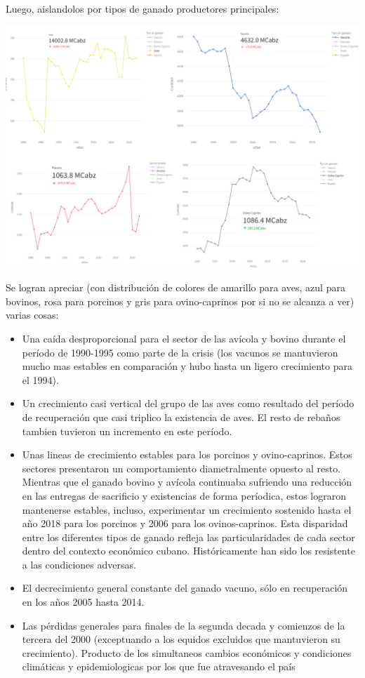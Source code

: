 \documentclass{article}
\begin{document}
Luego, aislandolos por tipos de ganado productores principales:
\begin{center}
    \includegraphics[width=1.0\textwidth]{img/plots_exist.png}
\end{center}
Se logran apreciar (con distribución de colores de amarillo para aves, azul para bovinos, rosa para porcinos y gris para ovino-caprinos por si no se alcanza a ver) varias cosas:
\begin{itemize}
    \item Una caída desproporcional para el sector de las avícola y bovino durante el período de 1990-1995 como parte de la crisis (los vacunos se mantuvieron mucho mas estables en comparación y hubo hasta un ligero crecimiento para el 1994).
    \item Un crecimiento casi vertical del grupo de las aves como resultado del período de recuperación que casi triplico la existencia de aves. El resto de rebaños tambien tuvieron un incremento en este período.
    \item Unas lineas de crecimiento estables para los porcinos y ovino-caprinos. Estos sectores presentaron un comportamiento diametralmente opuesto al resto. Mientras que el ganado bovino y avícola continuaba sufriendo una reducción en las 
    entregas de sacrificio y existencias de forma períodica, estos lograron mantenerse estables, incluso, experimentar un crecimiento sostenido hasta el año 2018 para los porcinos y 2006 para los ovinos-caprinos. Esta disparidad entre los diferentes 
    tipos de ganado refleja las particularidades de cada sector dentro del contexto económico cubano. Históricamente han sido los resistente a las condiciones adversas. 
    \item El decrecimiento general constante del ganado vacuno, sólo en recuperación en los años 2005 hasta 2014.
    \item Las pérdidas generales para finales de la segunda decada y comienzos de la tercera del 2000 (exceptuando a los equidos excluidos que mantuvieron su crecimiento). Producto de los simultaneos cambios económicos y condiciones climáticas y epidemiologicas por los que fue atravesando el país 
\end{itemize}
\end{document}
